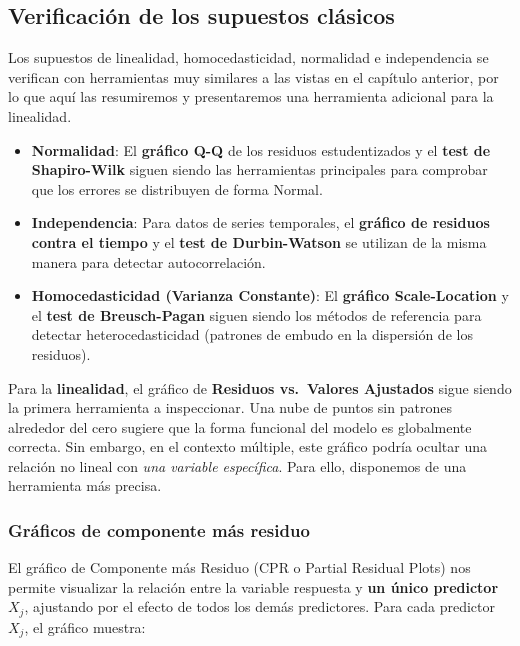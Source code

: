 \documentclass[
  letterpaper,
  DIV=11,
  numbers=noendperiod]{scrreprt}
\providecommand{\tightlist}{%
  \setlength{\itemsep}{0pt}\setlength{\parskip}{0pt}}
\begin{document}
\subsection{Verificación de los supuestos
clásicos}\label{verificaciuxf3n-de-los-supuestos-cluxe1sicos}

Los supuestos de linealidad, homocedasticidad, normalidad e
independencia se verifican con herramientas muy similares a las vistas
en el capítulo anterior, por lo que aquí las resumiremos y presentaremos
una herramienta adicional para la linealidad.

\begin{itemize}
\tightlist
\item
  \textbf{Normalidad}: El \textbf{gráfico Q-Q} de los residuos
  estudentizados y el \textbf{test de Shapiro-Wilk} siguen siendo las
  herramientas principales para comprobar que los errores se distribuyen
  de forma Normal.
\item
  \textbf{Independencia}: Para datos de series temporales, el
  \textbf{gráfico de residuos contra el tiempo} y el \textbf{test de
  Durbin-Watson} se utilizan de la misma manera para detectar
  autocorrelación.
\item
  \textbf{Homocedasticidad (Varianza Constante)}: El \textbf{gráfico
  Scale-Location} y el \textbf{test de Breusch-Pagan} siguen siendo los
  métodos de referencia para detectar heterocedasticidad (patrones de
  embudo en la dispersión de los residuos).
\end{itemize}

Para la \textbf{linealidad}, el gráfico de \textbf{Residuos vs.~Valores
Ajustados} sigue siendo la primera herramienta a inspeccionar. Una nube
de puntos sin patrones alrededor del cero sugiere que la forma funcional
del modelo es globalmente correcta. Sin embargo, en el contexto
múltiple, este gráfico podría ocultar una relación no lineal con
\emph{una variable específica}. Para ello, disponemos de una herramienta
más precisa.

\subsubsection{Gráficos de componente más
residuo}\label{gruxe1ficos-de-componente-muxe1s-residuo}

El gráfico de Componente más Residuo (CPR o Partial Residual Plots) nos
permite visualizar la relación entre la variable respuesta y \textbf{un
único predictor} \(X_j\), ajustando por el efecto de todos los demás
predictores. Para cada predictor \(X_j\), el gráfico muestra:
\end{document}
